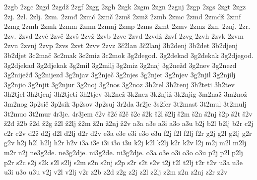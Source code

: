 {2zgb
2zgc
2zgd
2zgdž
2zgf
2zgg
2zgh
2zgk
2zgm
2zgn
2zgnj
2zgp
2zgs
2zgt
2zgz
2zj.
2zl.
2zlj.
2zm.
2zmđ
2zmć
2zmč
2zmš
2zmž
2zmb
2zmc
2zmd
2zmdž
2zmf
2zmg
2zmh
2zmk
2zmm
2zmn
2zmnj
2zmp
2zms
2zmt
2zmv
2zmz
2zn.
2znj.
2zr.
2zv.
2zvđ
2zvć
2zvč
2zvš
2zvž
2zvb
2zvc
2zvd
2zvdž
2zvf
2zvg
2zvh
2zvk
2zvm
2zvn
2zvnj
2zvp
2zvs
2zvt
2zvv
2zvz
3č2lan
3č2lanj
3b2denj
3b2det
3b2djenj
3b2djet
3c2mač
3c2mak
3c2miz
3c2mok
3g2degod.
3g2dekad
3g2dekak
3g2djegod.
3g2djekad
3g2djekak
3g2mil
3g2milj
3g2miz
3g2naj
3g2nežđ
3g2nev
3g2nezd
3g2niježđ
3g2nijezd
3g2njav
3g2nječ
3g2njes
3g2njet
3g2njev
3g2njil
3g2njilj
3g2njio
3g2njit
3g2njur
3g2noj
3g2nos
3g2noz
3h2tel
3h2tenj
3h2teti
3h2tev
3h2tjel
3h2tjenj
3h2tjeti
3h2tjev
3k2než
3k2nez
3k2njiž
3k2njig
3m2naž
3m2nož
3m2nog
3p2sič
3p2sik
3p2sov
3p2suj
3r2đa
3r2je
3s2fer
3t2mast
3t2mul
3t2mulj
3t2muo
3t2mur
4r3je.
4r3jem
č2v
š2ć
š2č
š2c
š2k
š2l
š2lj
š2m
š2n
š2nj
š2p
š2t
š2v
ž2đ
ž2b
ž2d
ž2g
ž2l
ž2lj
ž2m
ž2n
ž2nj
ž2v
a3a
a3e
a3i
a3o
a3u
b2j
b2l
b2lj
b2r
c2j
c2r
c2v
d2ž
d2j
d2l
d2lj
d2r
d2v
e3a
e3e
e3i
e3o
e3u
f2j
f2l
f2lj
f2r
g2j
g2l
g2lj
g2r
g2v
h2j
h2l
h2lj
h2r
h2v
i3a
i3e
i3i
i3o
i3u
k2j
k2l
k2lj
k2r
k2v
l2j
m2j
m2l
m2lj
m2r
n2j
ne3g2de.
ne3g2dje.
ni3g2de.
ni3g2dje.
o3a
o3e
o3i
o3o
o3u
p2j
p2l
p2lj
p2r
s2c
s2j
s2k
s2l
s2lj
s2m
s2n
s2nj
s2p
s2r
s2t
s2v
t2j
t2l
t2lj
t2r
t2v
u3a
u3e
u3i
u3o
u3u
v2j
v2l
v2lj
v2r
z2b
z2d
z2g
z2j
z2l
z2lj
z2m
z2n
z2nj
z2r
z2v
}
